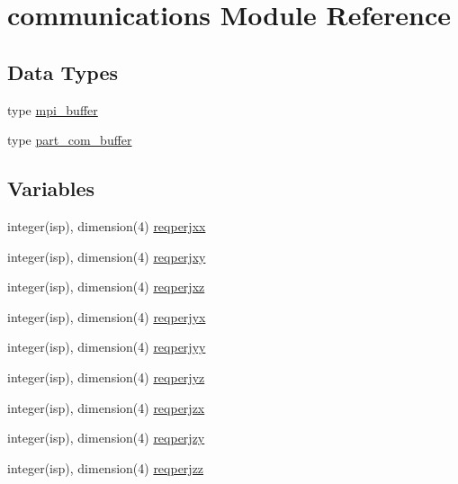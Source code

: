 \hypertarget{namespacecommunications}{}\section{communications Module Reference}
\label{namespacecommunications}
\subsection*{Data Types}
\begin{DoxyCompactItemize}
\item 
type \hyperlink{structcommunications_1_1mpi__buffer}{mpi\+\_\+buffer}
\item 
type \hyperlink{structcommunications_1_1part__com__buffer}{part\+\_\+com\+\_\+buffer}
\end{DoxyCompactItemize}
\subsection*{Variables}
\begin{DoxyCompactItemize}
\item 
integer(isp), dimension(4) \hyperlink{namespacecommunications_ab09f2571f6d9283fbc47609b3e6de32a}{reqperjxx}
\item 
integer(isp), dimension(4) \hyperlink{namespacecommunications_a579ce4f6ca8641ffb00fd802371714c3}{reqperjxy}
\item 
integer(isp), dimension(4) \hyperlink{namespacecommunications_afa5731d4931bff540f2d1e62849afb6c}{reqperjxz}
\item 
integer(isp), dimension(4) \hyperlink{namespacecommunications_a44e505738aca0afddea17f1b8800be28}{reqperjyx}
\item 
integer(isp), dimension(4) \hyperlink{namespacecommunications_afc48247f3f83606f2b7c1e498621fcd5}{reqperjyy}
\item 
integer(isp), dimension(4) \hyperlink{namespacecommunications_ae4760ee5787c5b5981856095495ea82d}{reqperjyz}
\item 
integer(isp), dimension(4) \hyperlink{namespacecommunications_a9a0f53e00bdcaa044856f745008de045}{reqperjzx}
\item 
integer(isp), dimension(4) \hyperlink{namespacecommunications_a76e287cb90a1968309c7e2370420748c}{reqperjzy}
\item 
integer(isp), dimension(4) \hyperlink{namespacecommunications_af38ed57408b60ed5170d54b350aa1b32}{reqperjzz}
\end{DoxyCompactItemize}


